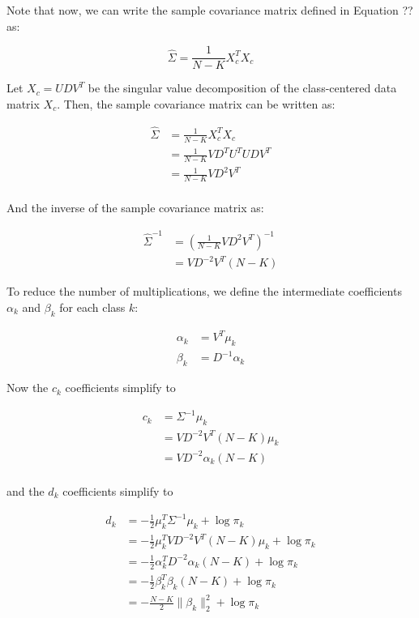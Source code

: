 \documentclass[a4paper,12pt]{article}
\begin{document}
Note that now, we can write the sample covariance matrix defined in Equation ?? as:

\[
\hat{\Sigma} = \frac{1}{N - K} X_c^T X_c
\]

Let $X_c = U D V^T$ be the singular value decomposition of the class-centered data matrix $X_c$. Then, the sample covariance matrix can be written as:

\begin{align*}
\hat{\Sigma} &= \frac{1}{N - K} X_{c}^{T} X_{c}  \\
&= \frac{1}{N - K} VD^{T}U^{T}UDV^{T} \\
&= \frac{1}{N - K} VD^{2}V^{T} \\
\end{align*}

And the inverse of the sample covariance matrix as:

\begin{align*}
\hat{\Sigma}^{-1} &= \left( \frac{1}{N-K} VD^{2}V^{T} \right)^{-1} \\
& = VD^{-2}V^{T} (N-K)
\end{align*}

To reduce the number of multiplications, we define the intermediate coefficients $\alpha_k$ and $\beta_k$ for each class $k$:


\begin{align*}
\alpha_{k} & = V^{T} \mu_{k}  \\
\beta_{k} &= D^{-1}\alpha_{k}
\end{align*}

Now the $c_{k}$ coefficients simplify to

\begin{align*}
c_{k} &= \Sigma^{-1} \mu_{k} \\
&= VD^{-2}V^{T} (N-K) \mu_{k} \\
&= VD^{-2} \alpha_{k} (N-K) \\
\end{align*}

and the $d_{k}$ coefficients simplify to

\begin{align*}
d_{k} &= -\frac{1}{2} \mu_{k}^{T} \Sigma^{-1} \mu_{k} + \log \pi_{k} \\
&= -\frac{1}{2} \mu_{k}^{T} VD^{-2}V^{T} (N-K) \mu_{k} + \log \pi_{k} \\
&= -\frac{1}{2} \alpha_{k}^{T} D^{-2} \alpha_{k} (N-K) + \log \pi_{k}  \\
&= -\frac{1}{2} \beta_{k}^{T} \beta_{k} (N-K) + \log \pi_{k} \\
& = - \frac{N-K}{2} \| \beta_{k} \|^2_{2} + \log \pi_{k}
\end{align*}
\end{document}
